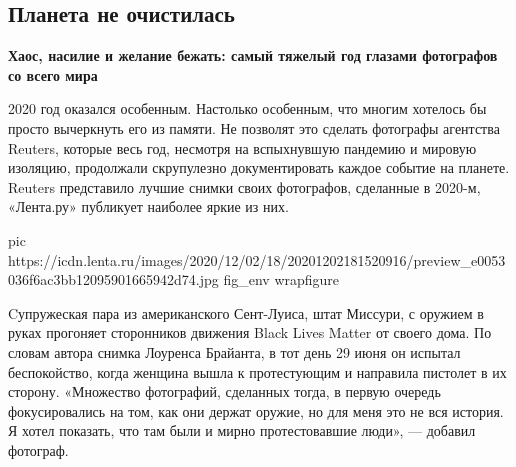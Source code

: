  
 
 
 
 
 
\subsection{Планета не очистилась}
\label{sec:08_12_2020.news.ru.lenta_ru.2.planeta}

\begin{leftbar}
	\bfseries
	Хаос, насилие и желание бежать: самый тяжелый год глазами фотографов со всего мира
\end{leftbar}

2020 год оказался особенным. Настолько особенным, что многим хотелось бы просто
вычеркнуть его из памяти. Не позволят это сделать фотографы агентства Reuters,
которые весь год, несмотря на вспыхнувшую пандемию и мировую изоляцию,
продолжали скрупулезно документировать каждое событие на планете. Reuters
представило лучшие снимки своих фотографов, сделанные в 2020-м, «Лента.ру»
публикует наиболее яркие из них.

\ifcmt
pic https://icdn.lenta.ru/images/2020/12/02/18/20201202181520916/preview_e0053036f6ac3bb12095901665942d74.jpg
fig_env wrapfigure
\fi

Cупружеская пара из американского Сент-Луиса, штат Миссури, с оружием в руках
прогоняет сторонников движения Black Lives Matter от своего дома. По словам
автора снимка Лоуренса Брайанта, в тот день 29 июня он испытал беспокойство,
когда женщина вышла к протестующим и направила пистолет в их сторону.
«Множество фотографий, сделанных тогда, в первую очередь фокусировались на том,
как они держат оружие, но для меня это не вся история. Я хотел показать, что
там были и мирно протестовавшие люди», — добавил фотограф.
